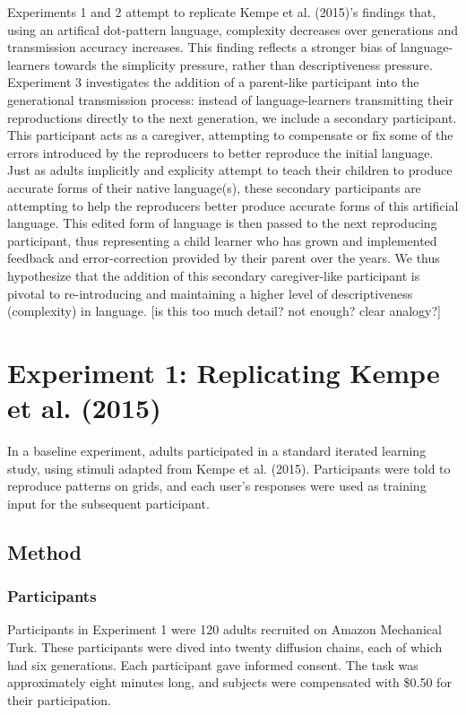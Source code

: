 \documentclass[10pt, letterpaper]{article}
\begin{document}
Experiments 1 and 2 attempt to replicate Kempe et al. (2015)'s findings
that, using an artifical dot-pattern language, complexity decreases over
generations and transmission accuracy increases. This finding reflects a
stronger bias of language-learners towards the simplicity pressure,
rather than descriptiveness pressure. Experiment 3 investigates the
addition of a parent-like participant into the generational transmission
process: instead of language-learners transmitting their reproductions
directly to the next generation, we include a secondary participant.
This participant acts as a caregiver, attempting to compensate or fix
some of the errors introduced by the reproducers to better reproduce the
initial language. Just as adults implicitly and explicity attempt to
teach their children to produce accurate forms of their native
language(s), these secondary participants are attempting to help the
reproducers better produce accurate forms of this artificial language.
This edited form of language is then passed to the next reproducing
participant, thus representing a child learner who has grown and
implemented feedback and error-correction provided by their parent over
the years. We thus hypothesize that the addition of this secondary
caregiver-like participant is pivotal to re-introducing and maintaining
a higher level of descriptiveness (complexity) in language. {[}is this
too much detail? not enough? clear analogy?{]}

\section{Experiment 1: Replicating Kempe et al.
(2015)}\label{experiment-1-replicating-kempe-2015}

In a baseline experiment, adults participated in a standard iterated
learning study, using stimuli adapted from Kempe et al. (2015).
Participants were told to reproduce patterns on grids, and each user's
responses were used as training input for the subsequent participant.

\subsection{Method}\label{method}

\subsubsection{Participants}\label{participants}

Participants in Experiment 1 were 120 adults recruited on Amazon
Mechanical Turk. These participants were dived into twenty diffusion
chains, each of which had six generations. Each participant gave
informed consent. The task was approximately eight minutes long, and
subjects were compensated with \$0.50 for their participation.
\end{document}
